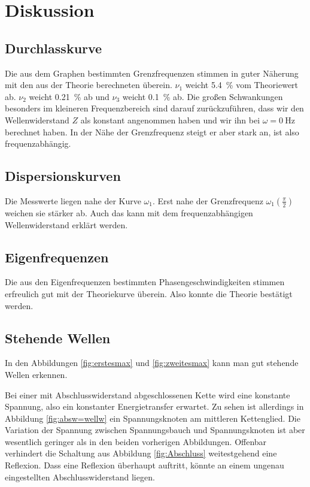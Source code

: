 \section{Diskussion}
\label{sec:Diskussion}

\subsection{Durchlasskurve}

Die aus dem Graphen bestimmten Grenzfrequenzen stimmen in guter Näherung mit
den aus der Theorie berechneten überein. $\nu_1$ weicht \SI{5.4}{\percent} vom
Theoriewert ab. $\nu_2$ weicht \SI{0.21}{\percent} ab und $\nu_3$ weicht \SI{0.1}{\percent}
ab. Die großen Schwankungen besonders im kleineren Frequenzbereich sind darauf
zurückzuführen, dass wir den Wellenwiderstand $Z$ als konstant angenommen haben und
wir ihn bei $\omega = \SI{0}{\hertz}$ berechnet haben. In der Nähe der Grenzfrequenz
steigt er aber stark an, ist also frequenzabhängig.

\subsection{Dispersionskurven}

Die Messwerte liegen nahe der Kurve $\omega_1$. Erst nahe der Grenzfrequenz
$\omega_1(\frac{\pi}{2})$ weichen sie stärker ab. Auch das kann mit dem
frequenzabhängigen Wellenwiderstand erklärt werden.

\subsection{Eigenfrequenzen}

Die aus den Eigenfrequenzen bestimmten Phasengeschwindigkeiten stimmen erfreulich
gut mit der Theoriekurve überein. Also konnte die Theorie bestätigt werden.

\subsection{Stehende Wellen}

In den Abbildungen \ref{fig:erstesmax} und \ref{fig:zweitesmax}
kann man gut stehende Wellen erkennen.

Bei einer mit Abschlusswiderstand abgeschlossenen Kette wird eine konstante Spannung,
also ein konstanter Energietransfer
erwartet. Zu sehen ist allerdings in Abbildung \ref{fig:absw=wellw} ein Spannungsknoten
am mittleren Kettenglied. Die Variation der Spannung zwischen Spannungsbauch
und Spannungsknoten ist aber wesentlich geringer als in den beiden vorherigen Abbildungen.
Offenbar verhindert die Schaltung aus Abbildung \ref{fig:Abschluss}
weitestgehend eine Reflexion. Dass eine Reflexion überhaupt auftritt, könnte an einem
ungenau eingestellten Abschlusswiderstand liegen.

